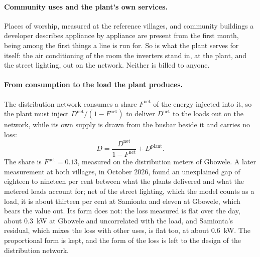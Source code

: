\documentclass[11pt,a4paper]{article}
\theoremstyle{plain}
\theoremstyle{definition}
\begin{document}
\paragraph{Community uses and the plant's own services.} Places of worship, measured at the
reference villages, and community buildings a developer describes appliance by appliance are
present from the first month, being among the first things a line is run for. So is what
the plant serves for itself: the air conditioning of the room the inverters stand in, at the
plant, and the street lighting, out on the network. Neither is billed to anyone.

\paragraph{From consumption to the load the plant produces.} The distribution network
consumes a share $F^{\mathrm{net}}$ of the energy injected into it, so the plant must inject
$D^{\mathrm{net}}/(1-F^{\mathrm{net}})$ to deliver $D^{\mathrm{net}}$ to the loads out on the
network, while its own supply is drawn from the busbar beside it and carries no loss:
\begin{equation}
  D = \frac{D^{\mathrm{net}}}{1-F^{\mathrm{net}}} + D^{\mathrm{plant}}.
  \label{eq:network-loss}
\end{equation}
The share is $F^{\mathrm{net}}=0.13$, measured on the distribution meters of Gbowele. A later
measurement at both villages, in October 2026, found an unexplained gap of eighteen to
nineteen per cent between what the plants delivered and what the metered loads account for;
net of the street lighting, which the model counts as a load, it is about thirteen per cent
at Samionta and eleven at Gbowele, which bears the value out. Its form does not: the loss
measured is flat over the day, about 0.3~kW at Gbowele and uncorrelated with the load, and
Samionta's residual, which mixes the loss with other uses, is flat too, at about 0.6~kW. The
proportional form is kept, and the form of the loss is left to the design of the
distribution network.
\end{document}
